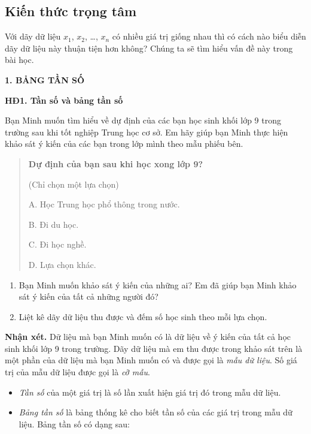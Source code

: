 \begin{lesson}
    \subsection{Kiến thức trọng tâm}

    Với dãy dữ liệu $x_1$, $x_2$, \ldots, $x_n$ có nhiều giá trị giống nhau thì có cách nào biểu diễn dãy dữ liệu này thuận tiện hơn không? Chúng ta sẽ tìm hiểu vấn đề này trong bài học.

    \textbf{1. BẢNG TẦN SỐ}

    \textbf{HĐ1. Tần số và bảng tần số}

    Bạn Minh muốn tìm hiểu về dự định của các bạn học sinh khối lớp 9 trong trường sau khi tốt nghiệp Trung học cơ sở. Em hãy giúp bạn Minh thực hiện khảo sát ý kiến của các bạn trong lớp mình theo mẫu phiếu bên.

    \begin{quote}
        \textbf{Dự định của bạn sau khi học xong lớp 9?}

        (Chỉ chọn một lựa chọn)

        A. Học Trung học phổ thông trong nước.

        B. Đi du học.

        C. Đi học nghề.

        D. Lựa chọn khác.
    \end{quote}

    \begin{enumerate}[label=\alph*)]
        \item Bạn Minh muốn khảo sát ý kiến của những ai? Em đã giúp bạn Minh khảo sát ý kiến của tất cả những người đó?
        \item Liệt kê dãy dữ liệu thu được và đếm số học sinh theo mỗi lựa chọn.
    \end{enumerate}

    \answerline
    \answerline

    \textbf{Nhận xét.} Dữ liệu mà bạn Minh muốn có là dữ liệu về ý kiến của tất cả học sinh khối lớp 9 trong trường. Dãy dữ liệu mà em thu được trong khảo sát trên là một phần của dữ liệu mà bạn Minh muốn có và được gọi là \textit{mẫu dữ liệu}. Số giá trị của mẫu dữ liệu được gọi là \textit{cỡ mẫu}.

    \begin{keyconcept}
        \begin{itemize}
            \item \textit{Tần số} của một giá trị là số lần xuất hiện giá trị đó trong mẫu dữ liệu.
            \item \textit{Bảng tần số} là bảng thống kê cho biết tần số của các giá trị trong mẫu dữ liệu. Bảng tần số có dạng sau:
        \end{itemize}


\end{keyconcept}
\end{lesson}
